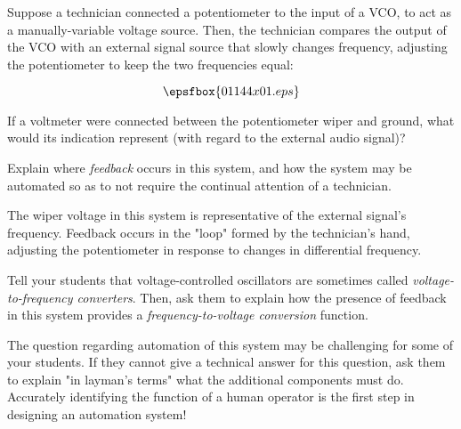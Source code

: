 

Suppose a technician connected a potentiometer to the input of a VCO, to act as a manually-variable voltage source.  Then, the technician compares the output of the VCO with an external signal source that slowly changes frequency, adjusting the potentiometer to keep the two frequencies equal:

$$\epsfbox{01144x01.eps}$$

If a voltmeter were connected between the potentiometer wiper and ground, what would its indication represent (with regard to the external audio signal)?

\vskip 10pt

Explain where {\it feedback} occurs in this system, and how the system may be automated so as to not require the continual attention of a technician.







The wiper voltage in this system is representative of the external signal's frequency.  Feedback occurs in the "loop" formed by the technician's hand, adjusting the potentiometer in response to changes in differential frequency.







Tell your students that voltage-controlled oscillators are sometimes called {\it voltage-to-frequency converters}.  Then, ask them to explain how the presence of feedback in this system provides a {\it frequency-to-voltage conversion} function.

The question regarding automation of this system may be challenging for some of your students.  If they cannot give a technical answer for this question, ask them to explain "in layman's terms" what the additional components must do.  Accurately identifying the function of a human operator is the first step in designing an automation system!



